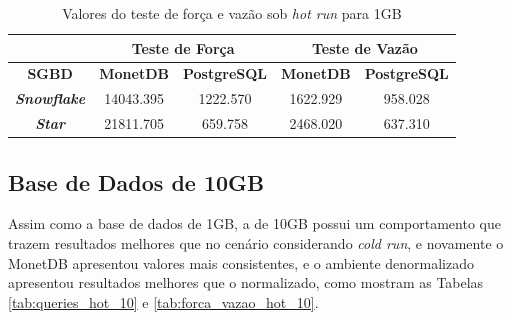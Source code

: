 \begin{table}[htpb]
        \centering
        \caption{Valores do teste de força e vazão sob \textit{hot run} para 1GB}
        \label{tab:forca_vazao_hot_1}
        \begin{tabular}{|c|c|c|c|c|} 
                \cline{2-5}
                \multicolumn{1}{c|}{}         & \multicolumn{2}{c|}{\textbf{Teste de Força} } & \multicolumn{2}{c|}{\textbf{Teste de Vazão} }  \\ 
                \hline
                 \textbf{SGBD}                & \textbf{MonetDB}  & \textbf{PostgreSQL}       & \textbf{MonetDB}  & \textbf{PostgreSQL}        \\ 
                \hline
                 \textit{\textbf{Snowflake}}  & 14043.395         & 1222.570                  & 1622.929          & 958.028                    \\ 
                \hline
                 \textit{\textbf{Star}}       & 21811.705         & 659.758                   & 2468.020          & 637.310                    \\
                \hline
                \end{tabular}
\end{table}



\subsection{Base de Dados de 10GB}

Assim como a base de dados de 1GB, a de 10GB possui um comportamento que trazem resultados melhores que no cenário considerando \textit{cold run}, e novamente o MonetDB apresentou valores mais consistentes, e o ambiente denormalizado apresentou resultados melhores que o normalizado, como mostram as Tabelas \ref{tab:queries_hot_10} e \ref{tab:forca_vazao_hot_10}.

